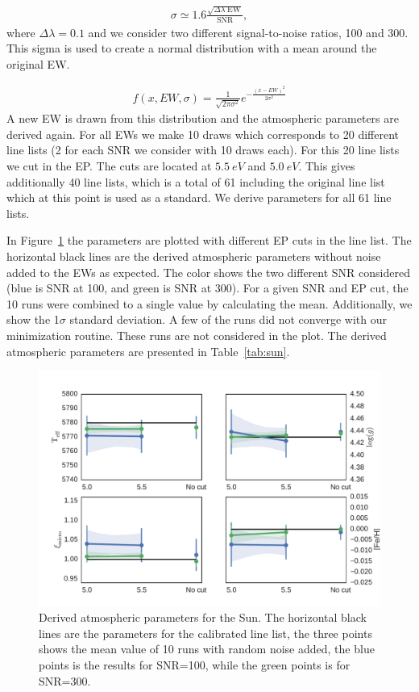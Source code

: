 \documentclass{aa}
\begin{document}
\begin{align}
    \sigma \simeq 1.6 \frac{\sqrt{\Delta\lambda\; \mathrm{EW}}}{\mathrm{SNR}},
\end{align}
where $\Delta\lambda=0.1$ and we consider two different signal-to-noise
ratios, 100 and 300. This sigma is used to create a normal distribution
with a mean around the original EW.

\begin{align}
    f(x, EW, \sigma) = \frac{1}{\sqrt{2\pi\sigma^2}} e^{-\frac{(x-EW)^2}{2\sigma^2}}
\end{align}
A new EW is drawn from this distribution and the atmospheric parameters
are derived again. For all EWs we make 10 draws which corresponds to
20 different line lists (2 for each SNR we consider with 10 draws
each). For this 20 line lists we cut in the EP. The cuts are located
at $\SI{5.5}{eV}$ and $\SI{5.0}{eV}$. This gives additionally 40 line
lists, which is a total of 61 including the original line list which at
this point is used as a standard. We derive parameters for all 61 line
lists.


In Figure~\ref{fig:solar_parameters} the parameters are plotted with
different EP cuts in the line list. The horizontal black lines are
the derived atmospheric parameters without noise added to the EWs as
expected. The color shows the two different SNR considered (blue is
SNR at 100, and green is SNR at 300). For a given SNR and EP cut,
the 10 runs were combined to a single value by calculating the mean.
Additionally, we show the 1$\sigma$ standard deviation. A few of the
runs did not converge with our minimization routine. These runs are not
considered in the plot. The derived atmospheric parameters are presented
in Table~\ref{tab:sun}.

\begin{figure}[t!]
    \centering
    \includegraphics[width=1.0\linewidth]{figures/solar_parameters_10runs.pdf}
    \caption{Derived atmospheric parameters for the Sun. The horizontal
    black lines are the parameters for the calibrated line list, the
    three points shows the mean value of 10 runs with random noise
    added, the blue points is the results for SNR=100, while the
    green points is for SNR=300.}
    \label{fig:solar_parameters}
\end{figure}
\end{document}

